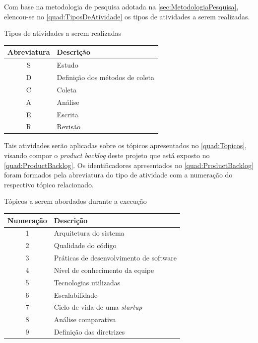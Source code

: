 Com base na metodologia de pesquisa adotada na \autoref{sec:MetodologiaPesquisa},
elencou-se no \autoref{quad:TiposDeAtividade} os tipos de atividades a serem
realizadas.

\begin{quadro}
    \caption{Tipos de atividades a serem realizadas\label{quad:TiposDeAtividade}}
    \begin{tabular}{ | c | l | }
    \hline
    \textbf{Abreviatura} &
        \textbf{Descrição} \\ \hline
        S & Estudo \\ \hline
        D & Definição dos métodos de coleta \\ \hline
        C & Coleta \\ \hline
        A & Análise \\ \hline
        E & Escrita \\ \hline
        R & Revisão \\ \hline
    \end{tabular}
\end{quadro}

Tais atividades serão aplicadas sobre os tópicos apresentados no \autoref{quad:Topicos},
visando compor o \textit{product backlog} deste projeto que está exposto
no \autoref{quad:ProductBacklog}. Os identificadores apresentados no
\autoref{quad:ProductBacklog} foram formados pela abreviatura do tipo de atividade com
a numeração do respectivo tópico relacionado.

\begin{quadro}
    \caption{Tópicos a serem abordados durante a execução\label{quad:Topicos}}
    \begin{tabular}{ | c | l | }
    \hline
    \textbf{Numeração} &
        \textbf{Descrição} \\ \hline
        1 & Arquitetura do sistema \\ \hline
        2 & Qualidade do código \\ \hline
        3 & Práticas de desenvolvimento de software \\ \hline
        4 & Nível de conhecimento da equipe \\ \hline
        5 & Tecnologias utilizadas \\ \hline
        6 & Escalabilidade \\ \hline
        7 & Ciclo de vida de uma \textit{startup} \\ \hline
        8 & Análise comparativa \\ \hline
        9 & Definição das diretrizes \\ \hline
    \end{tabular}
\end{quadro}

